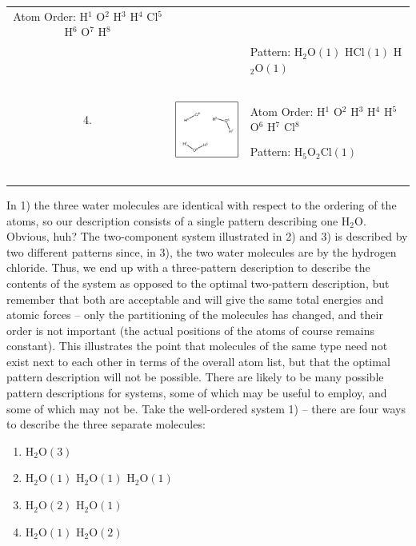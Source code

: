 \begin{table}
\begin{tabular}{c c l}
		Atom Order: H$^1$ O$^2$ H$^3$ H$^4$ Cl$^5$ H$^6$ O$^7$ H$^8$ \\
		& & Pattern: H$_2$O$(1)$ HCl$(1)$ H$_2$O$(1)$ \\\\\\\\\\\\
	4. & \multirow{2}{*}{ \includegraphics[width=3cm]{figures/pattern4.eps} } &
		Atom Order: H$^1$ O$^2$ H$^3$ H$^4$ H$^5$ O$^6$ H$^7$ Cl$^8$ \\
		& & Pattern: H$_5$O$_2$Cl$(1)$ \\\\\\\\\\\\
\end{tabular}
\end{table}


In 1) the three water molecules are identical with respect to the ordering of the atoms, so our description consists of a single pattern describing one H$_2$O. Obvious, huh? The two-component system illustrated in 2) and 3) is described by two different patterns since, in 3), the two water molecules are  by the hydrogen chloride. Thus, we end up with a three-pattern description to describe the contents of the system as opposed to the optimal two-pattern description, but remember that both are acceptable and will give the same total energies and atomic forces -- only the partitioning of the molecules has changed, and their order is not important (the actual positions of the atoms of course remains constant). This illustrates the point that molecules of the same type need not exist next to each other in terms of the overall atom list, but that the optimal pattern description will not be possible. There are likely to be many possible pattern descriptions for systems, some of which may be useful to employ, and some of which may not be. Take the well-ordered system 1) -- there are four ways to describe the three separate molecules:

\begin{enumerate}
	\item H$_2$O$(3)$
	\item H$_2$O$(1)$ H$_2$O$(1)$ H$_2$O$(1)$
	\item H$_2$O$(2)$ H$_2$O$(1)$
	\item H$_2$O$(1)$ H$_2$O$(2)$
\end{enumerate}

